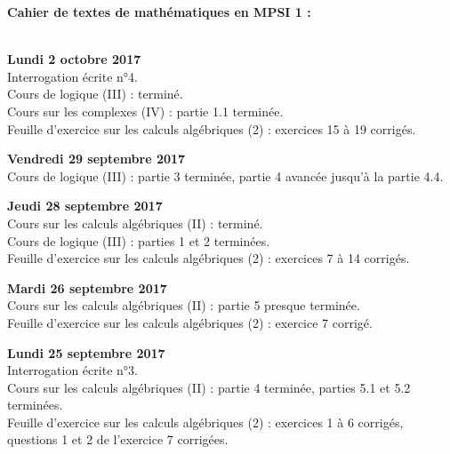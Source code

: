 \documentclass[12pt,a4paper]{article}
\begin{document}
\begin{center}
\Large\bf Cahier de textes de mathématiques en MPSI 1 :
\end{center}
\vspace{1cm}
\vspace{.4cm}\\

\noindent\textbf{Lundi 2 octobre 2017}\\
\bu{} Interrogation écrite n°4.\\
\bu{} Cours de logique (III) : terminé. \\
\bu{} Cours sur les complexes (IV) : partie 1.1 terminée. \\
\bu{} Feuille d'exercice sur les calculs algébriques (2) : exercices 15 à 19 corrigés. \\
\vspace{.4cm}

\noindent\textbf{Vendredi 29 septembre 2017}\\
\bu{} Cours de logique (III) : partie 3 terminée, partie 4 avancée jusqu'à la partie 4.4. \\
\vspace{.4cm}

\noindent\textbf{Jeudi 28 septembre 2017}\\
\bu{} Cours sur les calculs algébriques (II) : terminé. \\
\bu{} Cours de logique (III) : parties 1 et 2 terminées. \\
\bu{} Feuille d'exercice sur les calculs algébriques (2) : exercices 7 à 14 corrigés.  \\
\vspace{.4cm}

\noindent\textbf{Mardi 26 septembre 2017}\\
\bu{} Cours sur les calculs algébriques (II) : partie 5 presque terminée. \\
\bu{} Feuille d'exercice sur les calculs algébriques (2) : exercice 7 corrigé.  \\
\vspace{.4cm}

\noindent\textbf{Lundi 25 septembre 2017}\\
\bu{} Interrogation écrite n°3.\\
\bu{} Cours sur les calculs algébriques (II) : partie 4 terminée, parties 5.1 et 5.2 terminées. \\
\bu{} Feuille d'exercice sur les calculs algébriques (2) : exercices 1 à 6 corrigés, questions 1 et 2 de l'exercice 7 corrigées.  \\
\vspace{.4cm}
\end{document}
